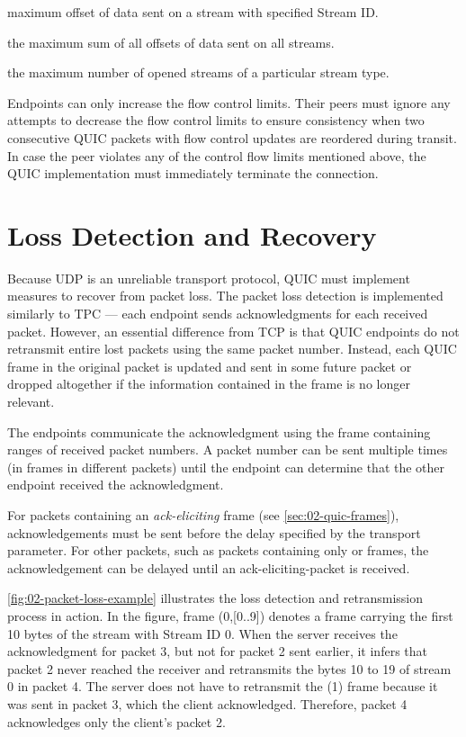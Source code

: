 \begin{itemize}

\litem[]{\MAXSTREAMDATA{}} maximum offset of data sent on a stream with specified Stream ID\@.

\litem[]{\MAXDATA{}} the maximum sum of all offsets of data sent on all streams.

\litem[]{\MAXSTREAMS{}} the maximum number of opened streams of a particular stream type.

\end{itemize}

Endpoints can only increase the flow control limits. Their peers must ignore any attempts to
decrease the flow control limits to ensure consistency when two consecutive QUIC packets with flow
control updates are reordered during transit. In case the peer violates any of the control flow
limits mentioned above, the QUIC implementation must immediately terminate the connection.

\section{Loss Detection and Recovery}\label{sec:02-loss-detection}

Because UDP is an unreliable transport protocol, QUIC must implement measures to recover from packet
loss. The packet loss detection is implemented similarly to TPC --- each endpoint sends
acknowledgments for each received packet. However, an essential difference from TCP is that QUIC
endpoints do not retransmit entire lost packets using the same packet number. Instead, each QUIC
frame in the original packet is updated and sent in some future packet or dropped altogether if the
information contained in the frame is no longer relevant.

The endpoints communicate the acknowledgment using the \ACK{} frame containing ranges of received
packet numbers. A packet number can be sent multiple times (in \ACK{} frames in different packets)
until the endpoint can determine that the other endpoint received the acknowledgment.

For packets containing an \textit{ack-eliciting} frame (see \autoref{sec:02-quic-frames}),
acknowledgements must be sent before the delay specified by the \MaxAckDelay{} transport parameter.
For other packets, such as packets containing only \ACK{} or \PADDING{} frames, the acknowledgement
can be delayed until an \gls{ack-eliciting-packet} is received.

\autoref{fig:02-packet-loss-example} illustrates the loss detection and retransmission process in
action. In the figure, frame \STREAM{}(0,[0..9]) denotes a \STREAM{} frame carrying the first 10
bytes of the stream with Stream ID 0. When the server receives the acknowledgment for packet 3, but
not for packet 2 sent earlier, it infers that packet 2 never reached the receiver and retransmits
the bytes 10 to 19 of stream 0 in packet 4. The server does not have to retransmit the \ACK{}(1)
frame because it was sent in packet 3, which the client acknowledged. Therefore, packet 4
acknowledges only the client's packet 2.

